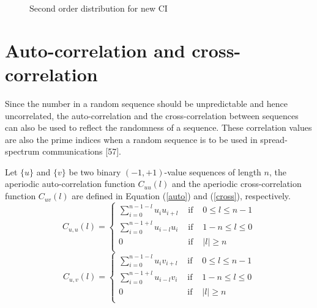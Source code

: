 \begin{figure}
 \hspace{0.5cm}
\caption{Second order distribution for new CI}
\label{Second order distribution for new CI}
\end{figure}


\section{Auto-correlation and cross-correlation}
Since the number in a random sequence should be unpredictable and hence uncorrelated,
the auto-correlation and the cross-correlation between sequences can also be used to reflect
the randomness of a sequence. These correlation values are also the prime indices when a
random sequence is to be used in spread-spectrum communications [57].

Let $\{u\}$ and $\{v\}$ be two binary $(-1,+1)$-value sequences of length $n$, the aperiodic
auto-correlation function $C_{uu}(l)$ and the aperiodic cross-correlation function $C_{uv}(l)$ are defined
in Equation (\ref{auto}) and (\ref{cross}), respectively.
\begin{equation}
\label{auto}
C_{u,u}(l)=
\left\{
\begin{array}{llc}
\sum_{i=0}^{n-1-l} u_{i}u_{i+l} & \text{ if }&0\leqslant l\leqslant n-1\\
\sum_{i=0}^{n-1+l} u_{i-l}u_{i}  & \text{ if }&1-n\leqslant l\leqslant 0 \\
0 & \text{ if }&|l|\geqslant n\\
\end{array}
\right.
\end{equation}
\begin{equation}
\label{cross}
C_{u,v}(l)=
\left\{
\begin{array}{llc}
\sum_{i=0}^{n-1-l} u_{i}v_{i+l} & \text{ if }&0\leqslant l\leqslant n-1\\
\sum_{i=0}^{n-1+l} u_{i-l}v_{i}  & \text{ if }&1-n\leqslant l\leqslant 0 \\
0 & \text{ if }&|l|\geqslant n\\
\end{array}
\right.
\end{equation}


